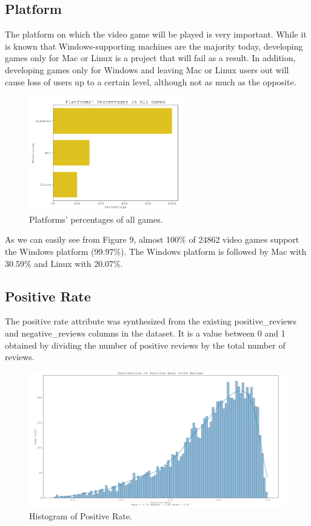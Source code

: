 \documentclass[conference]{IEEEtran}
\begin{document}
\subsection{Platform}
The platform on which the video game will be played is very important. While it is known that Windows-supporting machines are the majority today, developing games only for Mac or Linux is a project that will fail as a result. In addition, developing games only for Windows and leaving Mac or Linux users out will cause loss of users up to a certain level, although not as much as the opposite.

\begin{figure}[h]
  \includegraphics[width=\linewidth, height=5cm]{assets/platforms_dist.png}
  \caption{Platforms' percentages of all games.}
  \label{fig:platform1}
\end{figure}

As we can easily see from Figure 9, almost 100\% of 24862 video games support the Windows platform (99.97\%). The Windows platform is followed by Mac with 30.59\% and Linux with 20.07\%.

\subsection{Positive Rate}
The positive rate attribute was synthesized from the existing positive\_reviews and negative\_reviews columns in the dataset. It is a value between 0 and 1 obtained by dividing the number of positive reviews by the total number of reviews.

\begin{figure}[h]
  \includegraphics[width=\linewidth]{assets/positive_rate_dist.png}
  \caption{Histogram of Positive Rate.}
  \label{fig:positiverate1}
\end{figure}
\end{document}
